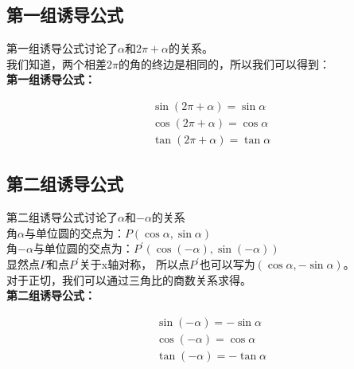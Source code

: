\documentclass[UTF8]{ctexart}
\begin{document}
\newpage

\subsection{第一组诱导公式}
    第一组诱导公式讨论了$\alpha$和$2\pi+\alpha$的关系。\\[3mm]
    我们知道，两个相差$2\pi$的角的终边是相同的，所以我们可以得到：\\
    \newline
    \textbf{第一组诱导公式：}
    \begin{large}
    \begin{align*}
        &\sin{(2\pi+\alpha)}=\sin{\alpha}\\[3mm]
        &\cos{(2\pi+\alpha)}=\cos{\alpha}\\[3mm]
        &\tan{(2\pi+\alpha)}=\tan{\alpha}
    \end{align*}
    \end{large}

\subsection{第二组诱导公式}
    第二组诱导公式讨论了$\alpha$和$-\alpha$的关系\\[3mm]
    角$\alpha$与单位圆的交点为：$P(\cos{\alpha},\sin{\alpha})$\\
    角$-\alpha$与单位圆的交点为：$P^{'}(\cos{(-\alpha)},\sin{(-\alpha)})$\\[3mm]
    显然点$P$和点$P^{'}$关于x轴对称，
    所以点$P^{'}$也可以写为$(\cos{\alpha},-\sin{\alpha})$。\\[3mm]
    对于正切，我们可以通过三角比的商数关系求得。\\
    \newline
    \textbf{第二组诱导公式：}
    \begin{large}
    \begin{align*}
        &\sin{(-\alpha)}=-\sin{\alpha}\\[3mm]
        &\cos{(-\alpha)}=\cos{\alpha}\\[3mm]
        &\tan{(-\alpha)}=-\tan{\alpha}
    \end{align*}
    \end{large}

\newpage
\end{document}

